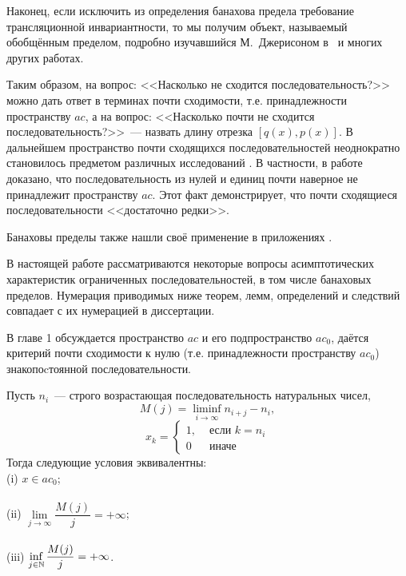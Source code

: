 Наконец, если исключить из определения банахова предела требование трансляционной инвариантности,
то мы получим объект, называемый обобщённым пределом,
подробно изучавшийся М.~Джерисоном в~\cite{jerison1957set} и многих других работах.


Таким образом, на вопрос: <<Насколько не сходится последовательность?>> %
можно дать ответ в терминах почти сходимости, т.е. принадлежности пространству $ac$,
а на вопрос: <<Насколько почти не сходится последовательность?>>~---
назвать длину отрезка $[q(x), p(x)]$.
В дальнейшем пространство почти сходящихся последовательностей неоднократно становилось предметом
различных исследований
\cite{semenov2006ac,usachev2008transforms}.
В частности, в работе~\cite{connor1990almost} доказано,
что последовательность из нулей и единиц почти наверное не принадлежит пространству $ac$.
Этот факт демонстрирует, что почти сходящиеся последовательности <<достаточно редки>>.


Банаховы пределы также нашли своё применение в приложениях
\cite{semenov2015banachtraces,SU,strukova2015spectres}.



В настоящей работе рассматриваются некоторые вопросы асимптотических характеристик ограниченных последовательностей,
в том числе банаховых пределов.
Нумерация приводимых ниже теорем, лемм, определений и следствий совпадает с их нумерацией в диссертации.


В главе 1 обсуждается пространство $ac$ и его подпространство $ac_0$,
даётся критерий почти сходимости к нулю (т.е. принадлежности пространству $ac_0$)
знакопоcтоянной последовательности.

	Пусть $n_i$~--- строго возрастающая последовательность натуральных чисел,
	\begin{equation}
		\label{eq:definition_M_j}
		M(j) = \liminf_{i\to\infty} n_{i+j} - n_i,
	\end{equation}
	\begin{equation}
		x_k = \left\{\begin{array}{ll}
			1, & \mbox{~если~} k = n_i
			\\
			0  & \mbox{~иначе~}
		\end{array}\right.
	\end{equation}
	Тогда следующие условия эквивалентны:
	\\
	(i)   $x \in ac_0$;
	\\\\
	(ii)  $\lim\limits_{j \to \infty} \dfrac{M(j)}{j} = +\infty$;
	\\\\
	(iii) $\inf\limits_{j \in \mathbb{N}}     \dfrac{M(j)}{j} = +\infty$.


